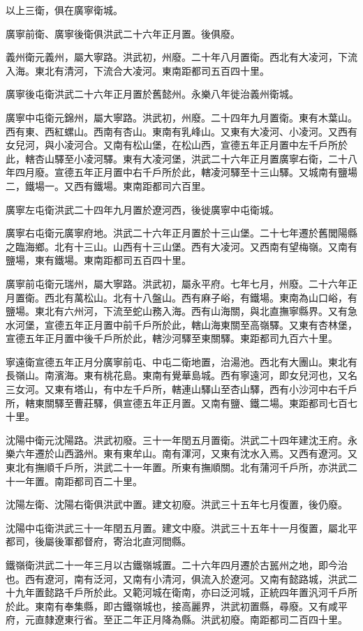 以上三衛，俱在廣寧衛城。

廣寧前衛、廣寧後衛俱洪武二十六年正月置。後俱廢。

義州衛元義州，屬大寧路。洪武初，州廢。二十年八月置衛。西北有大凌河，下流入海。東北有清河，下流合大凌河。東南距都司五百四十里。

廣寧後屯衛洪武二十六年正月置於舊懿州。永樂八年徙治義州衛城。

廣寧中屯衛元錦州，屬大寧路。洪武初，州廢。二十四年九月置衛。東有木葉山。西有東、西紅螺山。西南有杏山。東南有乳峰山。又東有大凌河、小凌河。又西有女兒河，與小凌河合。又南有松山堡，在松山西，宣德五年正月置中左千戶所於此，轄杏山驛至小凌河驛。東有大凌河堡，洪武二十六年正月置廣寧右衛，二十八年四月廢。宣德五年正月置中右千戶所於此，轄凌河驛至十三山驛。又城南有鹽場二，鐵場一。又西有鐵場。東南距都司六百里。

廣寧左屯衛洪武二十四年九月置於遼河西，後徙廣寧中屯衛城。

廣寧右屯衛元廣寧府地。洪武二十六年正月置於十三山堡。二十七年遷於舊閭陽縣之臨海鄉。北有十三山。山西有十三山堡。西有大凌河。又西南有望梅嶺。又南有鹽場，東有鐵場。東南距都司五百四十里。

廣寧前屯衛元瑞州，屬大寧路。洪武初，屬永平府。七年七月，州廢。二十六年正月置衛。西北有萬松山。北有十八盤山。西有麻子峪，有鐵場。東南為山口峪，有鹽場。東北有六州河，下流至蛇山務入海。西有山海關，與北直撫寧縣界。又有急水河堡，宣德五年正月置中前千戶所於此，轄山海東關至高嶺驛。又東有杏林堡，宣德五年正月置中後千戶所於此，轄沙河驛至東關驛。東距都司九百六十里。

寧遠衛宣德五年正月分廣寧前屯、中屯二衛地置，治湯池。西北有大團山。東北有長嶺山。南濱海。東有桃花島。東南有覺華島城。西有寧遠河，即女兒河也，又名三女河。又東有塔山，有中左千戶所，轄連山驛山至杏山驛，西有小沙河中右千戶所，轄東關驛至曹莊驛，俱宣德五年正月置。又南有鹽、鐵二場。東距都司七百七十里。

沈陽中衛元沈陽路。洪武初廢。三十一年閏五月置衛。洪武二十四年建沈王府。永樂六年遷於山西潞州。東有東牟山。南有渾河，又東有沈水入焉。又西有遼河。又東北有撫順千戶所，洪武二十一年置。所東有撫順關。北有蒲河千戶所，亦洪武二十一年置。南距都司百二十里。

沈陽左衛、沈陽右衛俱洪武中置。建文初廢。洪武三十五年七月復置，後仍廢。

沈陽中屯衛洪武三十一年閏五月置。建文中廢。洪武三十五年十一月復置，屬北平都司，後屬後軍都督府，寄治北直河間縣。

鐵嶺衛洪武二十一年三月以古鐵嶺城置。二十六年四月遷於古嚚州之地，即今治也。西有遼河，南有泛河，又南有小清河，俱流入於遼河。又南有懿路城，洪武二十九年置懿路千戶所於此。又範河城在衛南，亦曰泛河城，正統四年置汎河千戶所於此。東南有奉集縣，即古鐵嶺城也，接高麗界，洪武初置縣，尋廢。又有咸平府，元直隸遼東行省。至正二年正月降為縣。洪武初廢。南距都司二百四十里。

